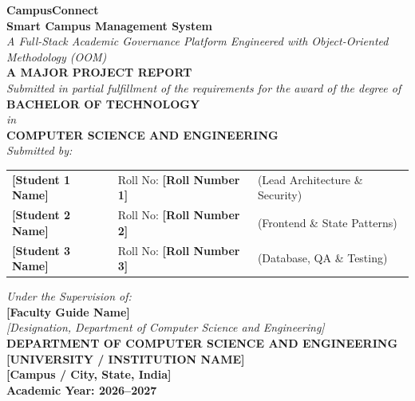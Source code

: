 \documentclass[12pt,a4paper,oneside]{report}
\begin{document}

\begin{titlepage}
\begin{center}
    \vspace*{0.5cm}
    {\Huge \textbf{\color{primarynavy}CampusConnect}}\\[0.3cm]
    {\LARGE \textbf{\color{accentindigo}Smart Campus Management System}}\\[0.4cm]
    {\large \textit{A Full-Stack Academic Governance Platform Engineered with Object-Oriented Methodology (OOM)}}\\[1.5cm]

    \textbf{A MAJOR PROJECT REPORT}\\[0.3cm]
    \textit{Submitted in partial fulfillment of the requirements for the award of the degree of}\\[0.3cm]
    \textbf{BACHELOR OF TECHNOLOGY}\\[0.2cm]
    \textit{in}\\[0.2cm]
    \textbf{COMPUTER SCIENCE AND ENGINEERING}\\[1.2cm]

    \textit{Submitted by:}\\[0.3cm]
    \begin{table}[h!]
    \centering
    \begin{tabular}{lll}
        \textbf{[Student 1 Name]} & \quad Roll No: \textbf{[Roll Number 1]} & \quad (Lead Architecture \& Security) \\
        \textbf{[Student 2 Name]} & \quad Roll No: \textbf{[Roll Number 2]} & \quad (Frontend \& State Patterns) \\
        \textbf{[Student 3 Name]} & \quad Roll No: \textbf{[Roll Number 3]} & \quad (Database, QA \& Testing) \\
    \end{tabular}
    \end{table}

    \vspace{0.8cm}
    \textit{Under the Supervision of:}\\[0.2cm]
    \textbf{[Faculty Guide Name]}\\[0.1cm]
    \textit{[Designation, Department of Computer Science and Engineering]}\\[1.2cm]

    \textbf{DEPARTMENT OF COMPUTER SCIENCE AND ENGINEERING}\\[0.2cm]
    \textbf{[UNIVERSITY / INSTITUTION NAME]}\\[0.1cm]
    \textbf{[Campus / City, State, India]}\\[0.3cm]
    \textbf{Academic Year: 2026--2027}
\end{center}
\end{titlepage}
\end{document}
